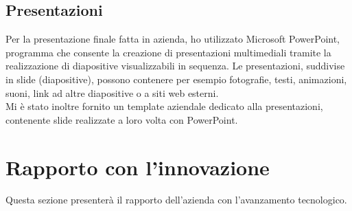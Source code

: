 	\subsection{Presentazioni}
	Per la presentazione finale fatta in azienda, ho utilizzato Microsoft PowerPoint, programma che consente la creazione di presentazioni multimediali tramite la realizzazione di diapositive visualizzabili in sequenza. Le presentazioni, suddivise in slide (diapositive), possono contenere per esempio fotografie, testi, animazioni, suoni, link ad altre diapositive o a siti web esterni. \\
	Mi è stato inoltre fornito un template aziendale dedicato alla presentazioni, contenente slide realizzate a loro volta con PowerPoint.

\section{Rapporto con l'innovazione}
\label{sec:rapporto_con_innovazione}
Questa sezione presenterà il rapporto dell'azienda con l'avanzamento tecnologico.
